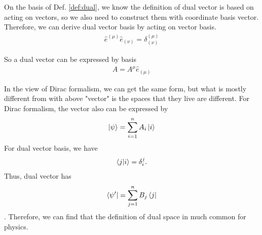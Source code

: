 On the basis of Def. \ref{def:dual}, we know the definition of dual vector is based on acting on vectors, so we also need to construct them with coordinate basis vector. Therefore, we can derive dual vector basis by acting on vector basis.
\begin{align}
    \hat{e}^{(\mu)}\hat{e}_{(\nu)}=\delta^{(\mu)}_{(\nu)}
\end{align}

So a dual vector can be expressed by basis
\begin{align}
    A=A^{\mu}\hat{e}_{(\mu)}
\end{align}

In the view of Dirac formalism, we can get the same form, but what is mostly different from with above "vector" is the spaces that they live are different. For Dirac formalism, the vector also can be expressed by 
\begin{align}
    \ket{\psi}=\sum_{i=1}^{n}A_{i}\ket{i}
\end{align}
For dual vector basis, we have
\begin{align}
    \braket{j}{i}=\delta^{j}_{i}.
\end{align}
Thus, dual vector has
\begin{align}
    \bra{\psi'}=\sum^{n}_{j=1}B_{j}\bra{j}
\end{align}.
Therefore, we can find that the definition of dual space in much common for physics.


